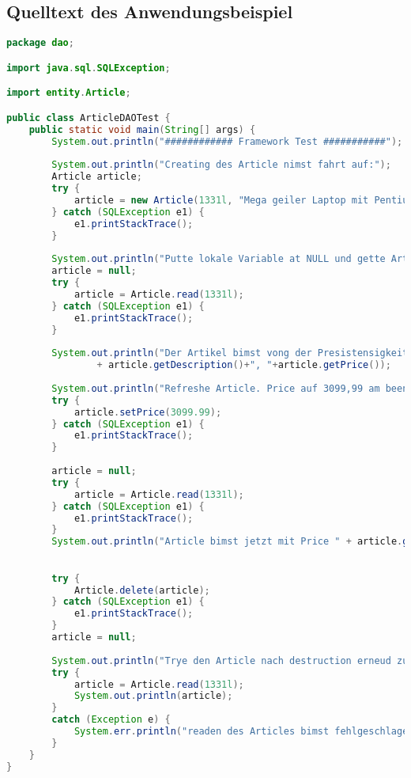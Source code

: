\subsection{Quelltext des Anwendungsbeispiel}
\begin{lstlisting}[language=java, style=java, caption={ArticleDAOTest.java},
label={lst:lst2}]
package dao;

import java.sql.SQLException;

import entity.Article;

public class ArticleDAOTest {
	public static void main(String[] args) {
		System.out.println("############ Framework Test ###########");
		
		System.out.println("Creating des Article nimst fahrt auf:");
        Article article;
		try {
			article = new Article(1331l, "Mega geiler Laptop mit Pentium 4 Prozessor", 2999.99);
		} catch (SQLException e1) {
			e1.printStackTrace();
		}
        
        System.out.println("Putte lokale Variable at NULL und gette Article back:");
        article = null;
        try {
			article = Article.read(1331l);
		} catch (SQLException e1) {
			e1.printStackTrace();
		}
        
        System.out.println("Der Artikel bimst vong der Presistensigkeit her follewed " + article.getArticleNumber() + " "
                + article.getDescription()+", "+article.getPrice());
                
        System.out.println("Refreshe Article. Price auf 3099,99 am been");
        try {
			article.setPrice(3099.99);
		} catch (SQLException e1) {
			e1.printStackTrace();
		}
        
        article = null;
        try {
			article = Article.read(1331l);
		} catch (SQLException e1) {
			e1.printStackTrace();
		}
        System.out.println("Article bimst jetzt mit Price " + article.getPrice());

 
        try {
			Article.delete(article);
		} catch (SQLException e1) {
			e1.printStackTrace();
		}
        article = null;
        
        System.out.println("Trye den Article nach destruction erneud zu readen: ");
        try {
            article = Article.read(1331l);
            System.out.println(article);
        }
        catch (Exception e) {
        	System.err.println("readen des Articles bimst fehlgeschlagen");
		}
	}
}
\end{lstlisting}
\clearpage

